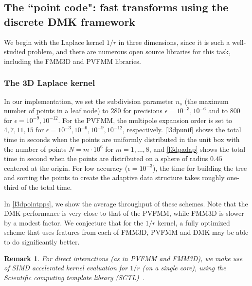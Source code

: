 \documentclass[final,letterpaper]{siamart171218}
\newtheorem{remark}[theorem]{Remark}
\newcommand{\acron}{DMK }
\begin{document}
\subsection{The ``point code": fast transforms using the discrete \acron framework}

We begin with the Laplace kernel $1/r$ in three dimensions, since it is such a well-studied
problem, and there are numerous open source libraries for this task, including the FMM3D and 
PVFMM libraries.

\subsubsection{The 3D Laplace kernel}

In our implementation, we set the subdivision parameter $n_s$ (the maximum number of points 
in a leaf node) to 
$280$ for precisions $\epsilon=10^{-3}, 10^{-6}$ and to $800$ for
$\epsilon=10^{-9}, 10^{-12}$. For the PVFMM,
the multipole expansion order is set to $4, 7, 11, 15$ for $\epsilon=10^{-3},
10^{-6}, 10^{-9}, 10^{-12}$, respectively.
\cref{l3dpunif} shows the total time in seconds when the points are uniformly
distributed in the unit box with the number of points
$N=m \cdot 10^6$ for $m=1,\ldots,8$,
and \cref{l3dpadap} shows the total time in second when the points are distributed
on a sphere of radius $0.45$ centered at the origin.
For low accuracy ($\epsilon=10^{-3}$), the time
for building the tree and sorting the points to create the adaptive data structure
takes roughly one-third of the total time. 

In \cref{l3dpointpps}, we show the average throughput of these schemes. Note that 
the \acron performance is very close to that of the PVFMM, 
while FMM3D is slower by a modest factor. We conjecture that for the $1/r$ kernel, 
a fully optimized scheme that uses features from each of FMM3D, PVFMM and \acron 
may be able to do significantly better.

\begin{remark}
  For direct interactions (as in PVFMM and FMM3D), we make use of 
  SIMD accelerated kernel evaluation for $1/r$ (on a single core),
  using the Scientific computing template library (SCTL)~\cite{sctl}.
\end{remark}
\end{document}
